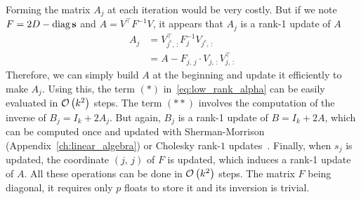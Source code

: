 Forming the matrix $A_j$ at each iteration would be very costly.
But if we note $F = 2D - \operatorname*{diag}\mathbf{s}$ and $A = V^\top F^{-1} V$,
it appears that $A_j$ is a rank-1 update of $A$
\begin{align*}
    A_j &= V_{j^c,\, :}^\top F_j^{-1} V_{j^c,\, :}\\
    &= A - F_{j,\, j} \cdot V_{j,\, :}V_{j,\, :}^\top
\end{align*}
Therefore, we can simply build $A$ at the beginning and update it efficiently to make $A_j$.
Using this, the term $(*)$ in~\ref{eq:low_rank_alpha} can be easily evaluated in $\mathcal{O}\left( k^2 \right)$ steps.
The term $(**)$ involves the computation of the inverse of $B_j = I_k + 2A_j$.
But again, $B_j$ is a rank-1 update of $B = I_k + 2A$,
which can be computed once
and updated with Sherman-Morrison (Appendix~\ref{ch:linear_algebra})
or Cholesky rank-$1$ updates~\citep{cholesky_rank_1}.
Finally, when $s_j$ is updated, the coordinate $(j,\, j)$ of $F$ is updated,
which induces a rank-1 update of $A$.
All these operations can be done in $\mathcal{O}\left( k^2 \right)$ steps.
The matrix $F$ being diagonal,
it requires only $p$ floats to store it and its inversion is trivial.

